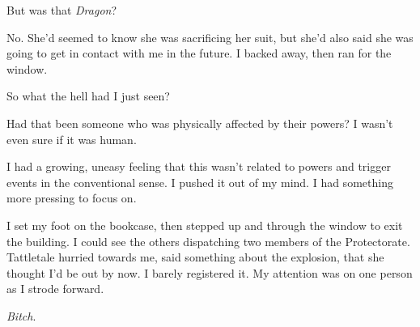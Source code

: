 But was that \emph{Dragon}?



No.  She'd seemed to know she was sacrificing her suit, but she'd also said she was going to get in contact with me in the future.  I backed away, then ran for the window.



So what the hell had I just seen?



Had that been someone who was physically affected by their powers?  I wasn't even sure if it was human.



I had a growing, uneasy feeling that this wasn't related to powers and trigger events in the conventional sense.  I pushed it out of my mind.  I had something more pressing to focus on.



I set my foot on the bookcase, then stepped up and through the window to exit the building.  I could see the others dispatching two members of the Protectorate.  Tattletale hurried towards me, said something about the explosion, that she thought I'd be out by now.  I barely registered it.  My attention was on one person as I strode forward.



\emph{Bitch}.






